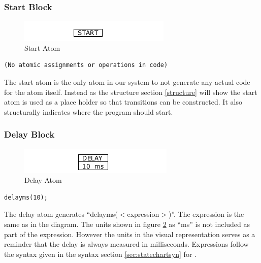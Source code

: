 \subsubsection{Start Block}

\begin{figure}[h]
	\centering
	\includegraphics[width=\imgmedphoto]{./images/correctness_atom_start.png}
	\caption{Start Atom}
	\label{fig:correctness_atom_start}
\end{figure}

\begin{lstlisting}[frame=single]
(No atomic assignments or operations in code)
\end{lstlisting}

The start atom is the only atom in our system to not generate any actual code for the atom itself. Instead as the structure section \ref{structure} will show the start atom is used as a place holder so that transitions can be constructed. It also structurally indicates where the program should start.


\subsubsection{Delay Block}

\begin{figure}[h]
	\centering
	\includegraphics[width=\imgmedphoto]{./images/correctness_atom_delay.png}
	\caption{Delay Atom}
	\label{fig:correctness_atom_delay}
\end{figure}

\begin{lstlisting}[frame=single]
delayms(10);
\end{lstlisting}

The delay atom generates ``delayms($<$expression$>$)''. The expression is the same as in the diagram. The units shown in figure \ref{fig:correctness_atom_delay} as ``ms'' is not included as part of the expression. However the units in the visual representation serves as a reminder that the delay is always measured in milliseconds. Expressions follow the syntax given in the syntax section \ref{sec:statechartsyn} for \plccharts.


